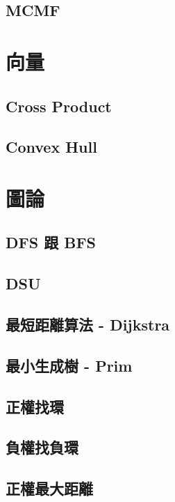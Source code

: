 \subsection{MCMF} 


\section{向量}
\subsection{Cross Product} 

\subsection{Convex Hull} 


\section{圖論}
\subsection{DFS 跟 BFS} 

\subsection{DSU} 

\subsection{最短距離算法 - Dijkstra}

\subsection{最小生成樹 - Prim}

\subsection{正權找環} 

\subsection{負權找負環} 

\subsection{正權最大距離} 

